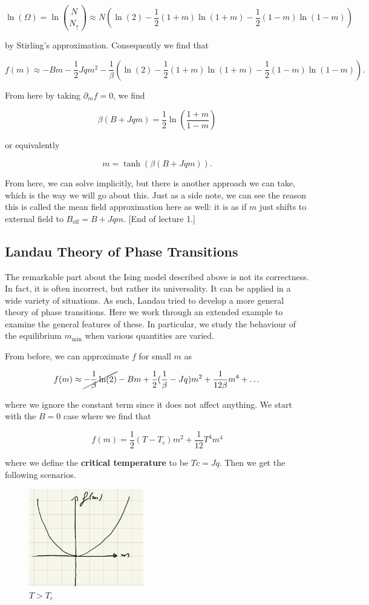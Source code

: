 \documentclass{article}
\theoremstyle{definition}
\begin{document}
$$ \ln(\Omega) = \ln \binom{N}{N_\uparrow} \approx N (\ln(2) - \frac{1}{2}(1 +
m) \ln(1 + m) - \frac{1}{2} (1 - m) \ln(1 - m)) $$

by Stirling's approximation. Consequently we find that

$$ f(m) \approx -Bm - \frac{1}{2} J q m^2 - \frac{1}{\beta} (\ln(2) -
\frac{1}{2} (1 + m) \ln(1 + m) - \frac{1}{2} (1 - m) \ln(1 - m)). $$

From here  by taking $\partial_m f = 0$, we find

$$ \beta(B + Jqm) = \frac{1}{2} \ln \left( \frac{1 + m}{1 - m} \right) $$

or equivalently

$$ m = \tanh(\beta (B + Jqm)). $$

From here, we can solve implicitly, but there is another approach we can take,
which is the way we will go about this. Just as a side note, we can see the
reason this is called the mean field approximation here as well: it is as if $m$
just shifts to external field to $B_{\text{eff}} = B + Jqm$. [End of lecture 1.]

\subsection{Landau Theory of Phase Transitions}

The remarkable part about the Ising model described above is not its
correctness. In fact, it is often incorrect, but rather its universality. It can
be applied in a wide variety of situations. As such, Landau tried to develop a
more general theory of phase transitions. Here we work through an extended
example to examine the general features of these. In particular, we study the
behaviour of the equilibrium $m_{\text{min}}$ when various quantities are varied.

From before, we can approximate $f$ for small $m$ as

$$ f(m) \approx \cancel{-\frac{1}{\beta} \ln(2)} - B m + \frac{1}{2} (\frac{1}{\beta} -
Jq) m^2 + \frac{1}{12\beta} m^4 + \dots $$

where we ignore the constant term since it does not affect anything. We start
with the $B = 0$ case where we find that

$$ f(m) = \frac{1}{2} (T - T_c) m^2 + \frac{1}{12} T^4 m^4  $$

where we define the \textbf{critical temperature} to be $Tc = Jq$. Then we get
the following scenarios.

\begin{figure}[H]
  \centering
  \includegraphics[width=5cm]{res/SFT/f_vs_m_high_T_B0}
  \caption{$T > T_c$}
  \label{figure: f_vs_m_high_T_B0}
\end{figure}
\end{document}
